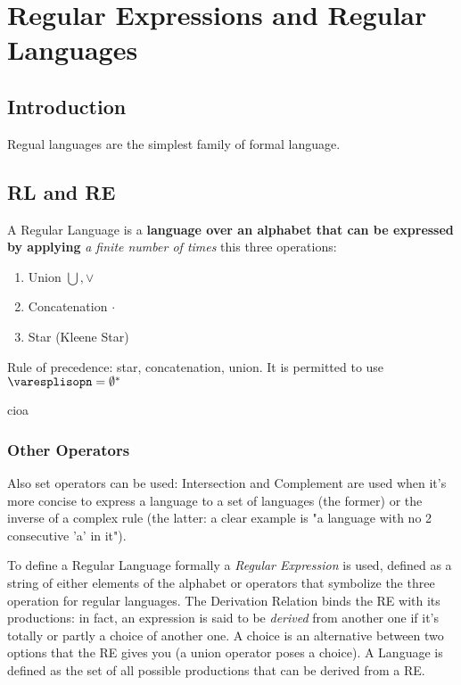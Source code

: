 \chapter{Regular Expressions and Regular Languages}
    \section{Introduction}
        Regual languages are the simplest family of formal language.
    \section{RL and RE}
    A Regular Language is a \textbf{language over an alphabet that can be expressed by applying} \emph{a finite number of times} this three operations:
        \begin{enumerate}
            \item Union $\bigcup, \vee$
            \item Concatenation $\cdot$
            \item Star (Kleene Star)
        \end{enumerate}
        Rule of precedence: star, concatenation, union.
        It is permitted to use $\varesplisopn = \emptyset^* $
        
        \begin{RegularLanguage}
            cioa
        \end{RegularLanguage}


        \subsection{Other Operators}
            Also set operators can be used: Intersection and Complement are used when it's more concise to express a language to a set of languages (the former) or the inverse of a complex rule (the latter: a clear example is "a language with no 2 consecutive 'a' in it").
        
        To define a Regular Language formally a \emph{Regular Expression} is used, defined as a string of either elements of the alphabet or operators that symbolize the three operation for regular languages.
        The Derivation Relation binds the RE with its productions: in fact, an expression is said to be \emph{derived} from another one if it's totally or partly a choice of another one. A choice is an alternative between two options that the RE gives you (a union operator poses a choice). A Language is defined as the set of all possible productions that can be derived from a RE.

